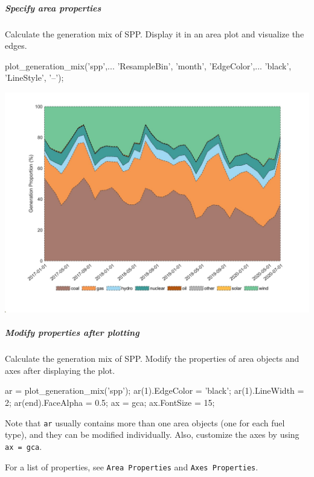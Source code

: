 \documentclass[11pt]{article}
\numberwithin{equation}{section}
\numberwithin{table}{section}
\numberwithin{figure}{section}
\begin{document}
\subparagraph{Specify area properties}
Calculate the generation mix of SPP. Display it in an area plot and visualize the edges.

\begin{Code}
  plot_generation_mix('spp',...
  'ResampleBin', 'month', 'EdgeColor',...
  'black', 'LineStyle', '--');
\end{Code}

\begin{center}
  \noindent\includegraphics[width=\textwidth]{figures/plot_generation_mix_example4.jpg}
\end{center}

\subparagraph{Modify properties after plotting}
Calculate the generation mix of SPP. Modify the properties of area objects and axes after displaying the plot.

\begin{Code}
  ar = plot_generation_mix('spp');
  ar(1).EdgeColor = 'black';
  ar(1).LineWidth = 2;
  ar(end).FaceAlpha = 0.5;
  ax = gca;
  ax.FontSize = 15;
\end{Code}

Note that \verb!ar! usually contains more than one area objects (one for each fuel type), and they can be modified individually. Also, customize the axes by using \verb!ax = gca!.

For a list of properties, see \verb!Area Properties! and \verb!Axes Properties!.
\end{document}
